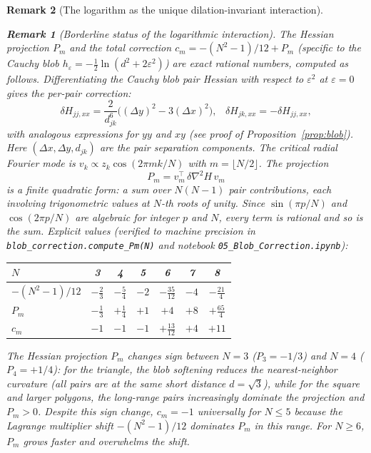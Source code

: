 \documentclass[12pt, a4paper]{article}
\newtheorem{remark}{Remark}[section]
\numberwithin{equation}{section}
\begin{document}
\begin{remark}[The logarithm as the unique dilation-invariant interaction]
\begin{remark}[Borderline status of the logarithmic interaction]
The Hessian projection $P_m$ and the total correction
$c_m = -(N^2{-}1)/12 + P_m$ (specific to the Cauchy blob
$h_\varepsilon = -\tfrac12\ln(d^2 + 2\varepsilon^2)$) are exact
rational numbers, computed as follows.  Differentiating the Cauchy
blob pair Hessian with respect to $\varepsilon^2$ at $\varepsilon=0$
gives the per-pair correction:
\begin{equation}\label{eq:blob_pair_correction}
  \delta H_{jj,xx} = \frac{2}{d_{jk}^6}\bigl((\Delta y)^2 - 3(\Delta x)^2\bigr),
  \;\;\;
  \delta H_{jk,xx} = -\delta H_{jj,xx},
\end{equation}
with analogous expressions for $yy$ and $xy$ (see proof of
Proposition~\ref{prop:blob}).  Here $(\Delta x, \Delta y, d_{jk})$
are the pair separation components.  The critical radial Fourier
mode is $v_k \propto z_k\cos(2\pi mk/N)$ with $m = \lfloor N/2\rfloor$.
The projection
\begin{equation}\label{eq:Pm_formula}
  P_m = v_m^\top\,\delta\nabla^2\!H\,v_m
\end{equation}
is a finite quadratic form: a sum over $N(N{-}1)$ pair
contributions, each involving trigonometric values at $N$-th roots
of unity.  Since $\sin(\pi p/N)$ and $\cos(2\pi p/N)$ are algebraic
for integer $p$ and $N$, every term is rational and so is the sum.
Explicit values (verified to machine precision in
\texttt{blob\_correction.compute\_Pm(N)} and notebook
\texttt{05\_Blob\_Correction.ipynb}):
\begin{center}
\begin{tabular}{lcccccc}
\toprule
$N$ & 3 & 4 & 5 & 6 & 7 & 8 \\
\midrule
$-(N^2{-}1)/12$ & $-\frac23$ & $-\frac54$ & $-2$ &
  $-\frac{35}{12}$ & $-4$ & $-\frac{21}{4}$ \\[3pt]
$P_m$ & $-\frac13$ & $+\frac14$ & $+1$ & $+4$ & $+8$ &
  $+\frac{65}{4}$ \\[3pt]
$c_m$ & $-1$ & $-1$ & $-1$ & $+\frac{13}{12}$ & $+4$ & $+11$ \\
\bottomrule
\end{tabular}
\end{center}

\noindent
The Hessian projection $P_m$ changes sign between $N = 3$
($P_3 = -1/3$) and $N = 4$ ($P_4 = +1/4$): for the triangle, the blob
softening reduces the nearest-neighbor curvature (all pairs are at the
same short distance $d = \sqrt{3}$), while for the square and larger
polygons, the long-range pairs increasingly dominate the projection
and $P_m > 0$.  Despite this sign change,
$c_m = -1$ universally for $N \le 5$ because the Lagrange multiplier
shift $-(N^2{-}1)/12$ dominates $P_m$ in this range.  For $N \ge 6$,
$P_m$ grows faster and overwhelms the shift.


\end{remark}
\end{remark}
\end{document}
